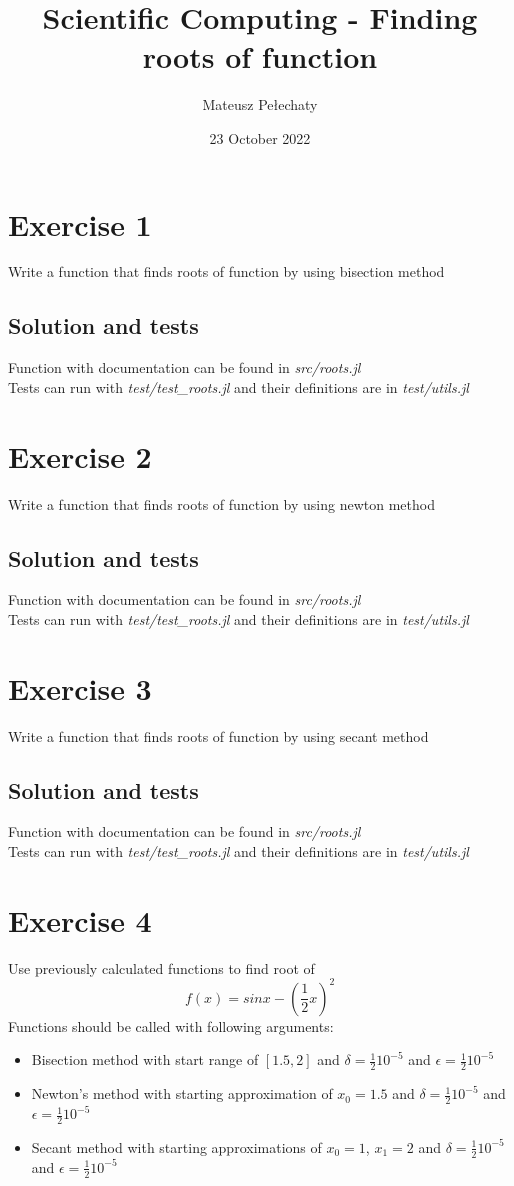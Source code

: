 \documentclass[11pt]{article}
\title{Scientific Computing - Finding roots of function}
\author{Mateusz Pełechaty}
\date{23 October 2022}%
\begin{document}
\maketitle


\section{Exercise 1}
Write a function that finds roots of function by using bisection method
\subsection*{Solution and tests}
Function with documentation can be found in \textit{src/roots.jl}\\
Tests can run with \textit{test/test\_roots.jl} and their definitions are in \textit{test/utils.jl}
\section{Exercise 2}
Write a function that finds roots of function by using newton method
\subsection*{Solution and tests}
Function with documentation can be found in \textit{src/roots.jl}\\
Tests can run with \textit{test/test\_roots.jl} and their definitions are in \textit{test/utils.jl}
\section{Exercise 3}
Write a function that finds roots of function by using secant method
\subsection*{Solution and tests}
Function with documentation can be found in \textit{src/roots.jl}\\
Tests can run with \textit{test/test\_roots.jl} and their definitions are in \textit{test/utils.jl}
\section{Exercise 4}
Use previously calculated functions to find root of 
$$f(x) = sin x - (\frac{1}{2}x)^2$$
Functions should be called with following arguments:
\begin{itemize}
    \item Bisection method with start range of $[1.5, 2]$ and $\delta = \frac{1}{2}10^{-5}$ and $\epsilon = \frac{1}{2}10^{-5}$
    \item Newton's method with starting approximation of $x_0=1.5$ and $\delta = \frac{1}{2}10^{-5}$ and $\epsilon = \frac{1}{2}10^{-5}$
    \item Secant method with starting approximations of $x_0 = 1$, ${x_1 = 2}$ and $\delta = \frac{1}{2}10^{-5}$ and $\epsilon = \frac{1}{2}10^{-5}$
\end{itemize}
\end{document}
